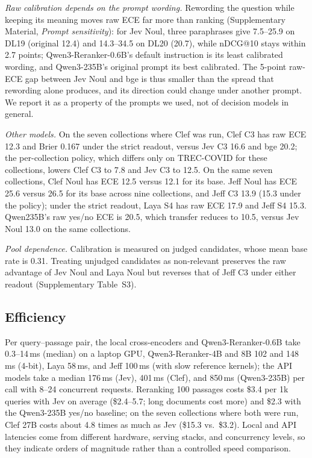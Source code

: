 \emph{Raw calibration depends on the prompt wording.} Rewording the question while keeping its meaning moves raw ECE far more than ranking (Supplementary Material, \emph{Prompt sensitivity}): for Jev Noul, three paraphrases give 7.5--25.9 on DL19 (original 12.4) and 14.3--34.5 on DL20 (20.7), while nDCG@10 stays within 2.7 points; Qwen3-Reranker-0.6B's default instruction is its least calibrated wording, and Qwen3-235B's original prompt its best calibrated. The 5-point raw-ECE gap between Jev Noul and bge is thus smaller than the spread that rewording alone produces, and its direction could change under another prompt. We report it as a property of the prompts we used, not of decision models in general.

\emph{Other models.} On the seven collections where Clef was run, Clef C3 has raw ECE 12.3 and Brier 0.167 under the strict readout, versus Jev C3 16.6 and bge 20.2; the per-collection policy, which differs only on TREC-COVID for these collections, lowers Clef C3 to 7.8 and Jev C3 to 12.5. On the same seven collections, Clef Noul has ECE 12.5 versus 12.1 for its base. Jeff Noul has ECE 25.6 versus 26.5 for its base across nine collections, and Jeff C3 13.9 (15.3 under the policy); under the strict readout, Laya S4 has raw ECE 17.9 and Jeff S4 15.3. Qwen235B's raw yes/no ECE is 20.5, which transfer reduces to 10.5, versus Jev Noul 13.0 on the same collections.

\emph{Pool dependence.} Calibration is measured on judged candidates, whose mean base rate is 0.31. Treating unjudged candidates as non-relevant preserves the raw advantage of Jev Noul and Laya Noul but reverses that of Jeff C3 under either readout (Supplementary Table~S3).

\subsection{Efficiency}

Per query--passage pair, the local cross-encoders and Qwen3-Reranker-0.6B take 0.3--14\,ms (median) on a laptop GPU, Qwen3-Reranker-4B and 8B 102 and 148\,ms (4-bit), Laya 58\,ms, and Jeff 100\,ms (with slow reference kernels); the API models take a median 176\,ms (Jev), 401\,ms (Clef), and 850\,ms (Qwen3-235B) per call with 8--24 concurrent requests. Reranking 100 passages costs \$3.4 per 1k queries with Jev on average (\$2.4--5.7; long documents cost more) and \$2.3 with the Qwen3-235B yes/no baseline; on the seven collections where both were run, Clef 27B costs about 4.8 times as much as Jev (\$15.3 vs.\ \$3.2). Local and API latencies come from different hardware, serving stacks, and concurrency levels, so they indicate orders of magnitude rather than a controlled speed comparison.


